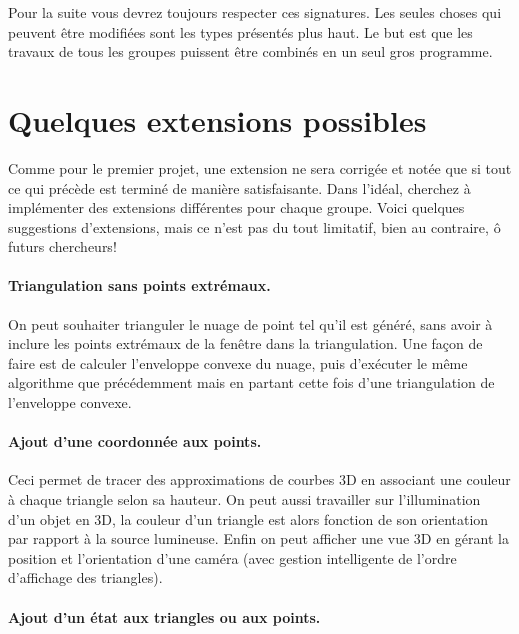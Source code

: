 \documentclass{../../../LaTeX/tdsimple}
\begin{document}
Pour la suite vous devrez toujours respecter ces signatures.  Les
seules choses qui peuvent être modifiées sont les types présentés plus
haut.  Le but est que les travaux de tous les groupes puissent être
combinés en un seul gros programme.

\section{Quelques extensions possibles}

Comme pour le premier projet, une extension ne sera corrigée et notée
que si tout ce qui précède est terminé de manière satisfaisante. Dans
l'idéal, cherchez à implémenter des extensions différentes pour chaque
groupe.
Voici quelques suggestions d'extensions, mais ce n'est pas du tout
limitatif, bien au contraire, ô futurs chercheurs!

\paragraph{Triangulation sans points extrémaux.}

On peut souhaiter trianguler le nuage de point tel qu'il est généré,
sans avoir à inclure les points extrémaux de la fenêtre dans la
triangulation. Une façon de faire est de calculer l'enveloppe convexe
du nuage, puis d'exécuter le même algorithme que précédemment mais en
partant cette fois d'une triangulation de l'enveloppe convexe.

\paragraph{Ajout d'une coordonnée aux points.}

Ceci permet de tracer des approximations de courbes 3D en associant
une couleur à chaque triangle selon sa hauteur.  On peut aussi
travailler sur l'illumination d'un objet en 3D, la couleur d'un
triangle est alors fonction de son orientation par rapport à la source
lumineuse.  Enfin on peut afficher une vue 3D en gérant la position et
l'orientation d'une caméra (avec gestion intelligente de l'ordre
d'affichage des triangles).

\paragraph{Ajout d'un état aux triangles ou aux points.}
\end{document}
